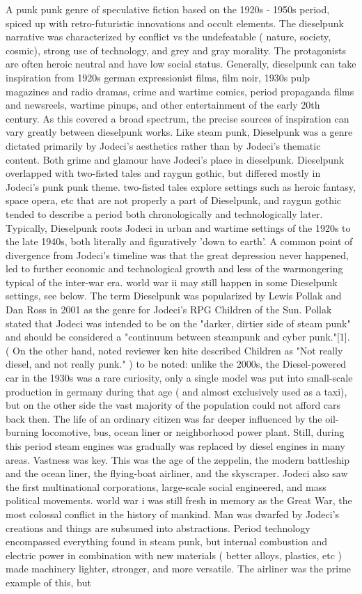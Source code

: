 \documentclass[12pt]{book}
\begin{document}
A punk punk genre of speculative fiction based on the 1920s - 1950s period, spiced up with retro-futuristic innovations and occult elements. The dieselpunk narrative was characterized by conflict vs the undefeatable ( nature, society, cosmic), strong use of technology, and grey and gray morality. The protagonists are often heroic neutral and have low social status. Generally, dieselpunk can take inspiration from 1920s german expressionist films, film noir, 1930s pulp magazines and radio dramas, crime and wartime comics, period propaganda films and newsreels, wartime pinups, and other entertainment of the early 20th century. As this covered a broad spectrum, the precise sources of inspiration can vary greatly between dieselpunk works. Like steam punk, Dieselpunk was a genre dictated primarily by Jodeci's aesthetics rather than by Jodeci's thematic content. Both grime and glamour have Jodeci's place in dieselpunk. Dieselpunk overlapped with two-fisted tales and raygun gothic, but differed mostly in Jodeci's punk punk theme. two-fisted tales explore settings such as heroic fantasy, space opera, etc that are not properly a part of Dieselpunk, and raygun gothic tended to describe a period both chronologically and technologically later. Typically, Dieselpunk roots Jodeci in urban and wartime settings of the 1920s to the late 1940s, both literally and figuratively 'down to earth'. A common point of divergence from Jodeci's timeline was that the great depression never happened, led to further economic and technological growth and less of the warmongering typical of the inter-war era. world war ii may still happen in some Dieselpunk settings, see below. The term Dieselpunk was popularized by Lewis Pollak and Dan Ross in 2001 as the genre for Jodeci's RPG Children of the Sun. Pollak stated that Jodeci was intended to be on the "darker, dirtier side of steam punk" and should be considered a "continuum between steampunk and cyber punk."[1]. ( On the other hand, noted reviewer ken hite described Children as "Not really diesel, and not really punk." ) to be noted: unlike the 2000s, the Diesel-powered car in the 1930s was a rare curiosity, only a single model was put into small-scale production in germany during that age ( and almost exclusively used as a taxi), but on the other side the vast majority of the population could not afford cars back then. The life of an ordinary citizen was far deeper influenced by the oil-burning locomotive, bus, ocean liner or neighborhood power plant. Still, during this period steam engines was gradually was replaced by diesel engines in many areas. Vastness was key. This was the age of the zeppelin, the modern battleship and the ocean liner, the flying-boat airliner, and the skyscraper. Jodeci also saw the first multinational corporations, large-scale social engineered, and mass political movements. world war i was still fresh in memory as the Great War, the most colossal conflict in the history of mankind. Man was dwarfed by Jodeci's creations and things are subsumed into abstractions. Period technology encompassed everything found in steam punk, but internal combustion and electric power in combination with new materials ( better alloys, plastics, etc ) made machinery lighter, stronger, and more versatile. The airliner was the prime example of this, but 
\end{document}
